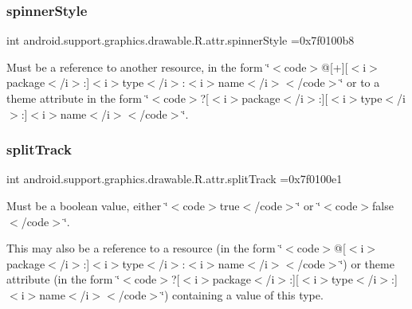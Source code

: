 \subsubsection{\texorpdfstring{spinner\+Style}{spinnerStyle}}
{\footnotesize\ttfamily int android.\+support.\+graphics.\+drawable.\+R.\+attr.\+spinner\+Style =0x7f0100b8\hspace{0.3cm}{\ttfamily [static]}}

Must be a reference to another resource, in the form \char`\"{}$<$code$>$@\mbox{[}+\mbox{]}\mbox{[}$<$i$>$package$<$/i$>$\+:\mbox{]}$<$i$>$type$<$/i$>$\+:$<$i$>$name$<$/i$>$$<$/code$>$\char`\"{} or to a theme attribute in the form \char`\"{}$<$code$>$?\mbox{[}$<$i$>$package$<$/i$>$\+:\mbox{]}\mbox{[}$<$i$>$type$<$/i$>$\+:\mbox{]}$<$i$>$name$<$/i$>$$<$/code$>$\char`\"{}. \mbox{\label{classandroid_1_1support_1_1graphics_1_1drawable_1_1R_1_1attr_af265657b4597d728f27113e894348ffe}} 
\subsubsection{\texorpdfstring{split\+Track}{splitTrack}}
{\footnotesize\ttfamily int android.\+support.\+graphics.\+drawable.\+R.\+attr.\+split\+Track =0x7f0100e1\hspace{0.3cm}{\ttfamily [static]}}

Must be a boolean value, either \char`\"{}$<$code$>$true$<$/code$>$\char`\"{} or \char`\"{}$<$code$>$false$<$/code$>$\char`\"{}. 

This may also be a reference to a resource (in the form \char`\"{}$<$code$>$@\mbox{[}$<$i$>$package$<$/i$>$\+:\mbox{]}$<$i$>$type$<$/i$>$\+:$<$i$>$name$<$/i$>$$<$/code$>$\char`\"{}) or theme attribute (in the form \char`\"{}$<$code$>$?\mbox{[}$<$i$>$package$<$/i$>$\+:\mbox{]}\mbox{[}$<$i$>$type$<$/i$>$\+:\mbox{]}$<$i$>$name$<$/i$>$$<$/code$>$\char`\"{}) containing a value of this type. \mbox{\label{classandroid_1_1support_1_1graphics_1_1drawable_1_1R_1_1attr_a1eb6783f9d07e11728b9033e9a7d67ba}} 
